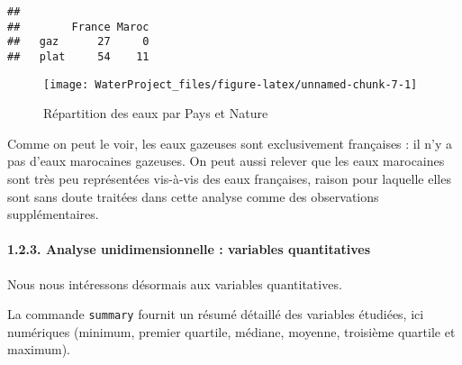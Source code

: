 \documentclass[]{article}
\newenvironment{Shaded}{\begin{snugshade}}{\end{snugshade}}
\newcommand{\KeywordTok}[1]{\textcolor[rgb]{0.13,0.29,0.53}{\textbf{#1}}}
\newcommand{\DataTypeTok}[1]{\textcolor[rgb]{0.13,0.29,0.53}{#1}}
\newcommand{\OtherTok}[1]{\textcolor[rgb]{0.56,0.35,0.01}{#1}}
\newcommand{\OperatorTok}[1]{\textcolor[rgb]{0.81,0.36,0.00}{\textbf{#1}}}
\newcommand{\NormalTok}[1]{#1}
\let\oldparagraph\paragraph
\renewcommand{\paragraph}[1]{\oldparagraph{#1}\mbox{}}
\begin{document}
\begin{Shaded}
\end{Shaded}

\begin{verbatim}
##       
##        France Maroc
##   gaz      27     0
##   plat     54    11
\end{verbatim}

\begin{Shaded}
\end{Shaded}

\begin{figure}

{\centering \texttt{[image: WaterProject\_files/figure-latex/unnamed-chunk-7-1]} 

}

\caption{Répartition des eaux par Pays et Nature}\label{fig:unnamed-chunk-7}
\end{figure}

 Comme on peut le voir, les eaux gazeuses sont exclusivement françaises
: il n'y a pas d'eaux marocaines gazeuses. On peut aussi relever que les
eaux marocaines sont très peu représentées vis-à-vis des eaux
françaises, raison pour laquelle elles sont sans doute traitées dans
cette analyse comme des observations supplémentaires.

\hypertarget{analyse-unidimensionnelle-variables-quantitatives}{\paragraph{1.2.3.
Analyse unidimensionnelle : variables
quantitatives}\label{analyse-unidimensionnelle-variables-quantitatives}}

Nous nous intéressons désormais aux variables quantitatives.

La commande \texttt{summary} fournit un résumé détaillé des variables
étudiées, ici numériques (minimum, premier quartile, médiane, moyenne,
troisième quartile et maximum).
\end{document}
